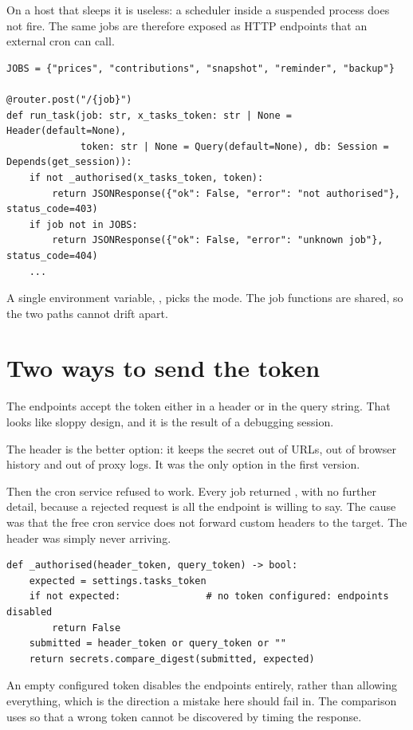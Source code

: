 On a host that sleeps it is useless: a scheduler inside a suspended process does
not fire. The same jobs are therefore exposed as HTTP endpoints that an external
cron can call.

\begin{lstlisting}[style=py]
JOBS = {"prices", "contributions", "snapshot", "reminder", "backup"}

@router.post("/{job}")
def run_task(job: str, x_tasks_token: str | None = Header(default=None),
             token: str | None = Query(default=None), db: Session = Depends(get_session)):
    if not _authorised(x_tasks_token, token):
        return JSONResponse({"ok": False, "error": "not authorised"}, status_code=403)
    if job not in JOBS:
        return JSONResponse({"ok": False, "error": "unknown job"}, status_code=404)
    ...
\end{lstlisting}

A single environment variable, , picks the mode. The job
functions are shared, so the two paths cannot drift apart.

\section{Two ways to send the token}

The endpoints accept the token either in a header or in the query string. That
looks like sloppy design, and it is the result of a debugging session.

The header is the better option: it keeps the secret out of URLs, out of browser
history and out of proxy logs. It was the only option in the first version.

Then the cron service refused to work. Every job returned , with no
further detail, because a rejected request is all the endpoint is willing to say.
The cause was that the free cron service does not forward custom headers to the
target. The header was simply never arriving.

\begin{lstlisting}[style=py]
def _authorised(header_token, query_token) -> bool:
    expected = settings.tasks_token
    if not expected:               # no token configured: endpoints disabled
        return False
    submitted = header_token or query_token or ""
    return secrets.compare_digest(submitted, expected)
\end{lstlisting}

An empty configured token disables the endpoints entirely, rather than allowing
everything, which is the direction a mistake here should fail in. The comparison
uses  so that a wrong token cannot be discovered by timing
the response.

